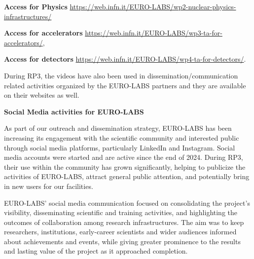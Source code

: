 \textbf{Access for Physics} \url{https://web.infn.it/EURO-LABS/wp2-nuclear-physics-infrastructures/}

\textbf{Access for accelerators} \url{https://web.infn.it/EURO-LABS/wp3-ta-for-accelerators/},

\textbf{Access for detectors} \url{https://web.infn.it/EURO-LABS/wp4-ta-for-detectors/}.

During RP3, the videos have also been used in dissemination/communication related activities organized by the  EURO-LABS partners and they are available on their websites as well.

\textbf{Social Media activities for EURO-LABS}

As part of our outreach and dissemination strategy, EURO-LABS has been increasing its engagement with the scientific community and interested public through social media platforms, particularly LinkedIn and Instagram. 
Social media accounts were started and are active since the end of 2024.
During RP3, their use within the community has grown significantly, helping to publicize the activities of EURO-LABS, attract general public attention, and potentially bring in new users for our facilities.

EURO-LABS' social media communication focused on consolidating the project's visibility, disseminating scientific and training activities, and highlighting the outcomes of collaboration among research infrastructures. The aim was to keep researchers, institutions, early-career scientists and wider audiences informed about achievements and events, while giving greater prominence to the results and lasting value of the project as it approached completion.
  
